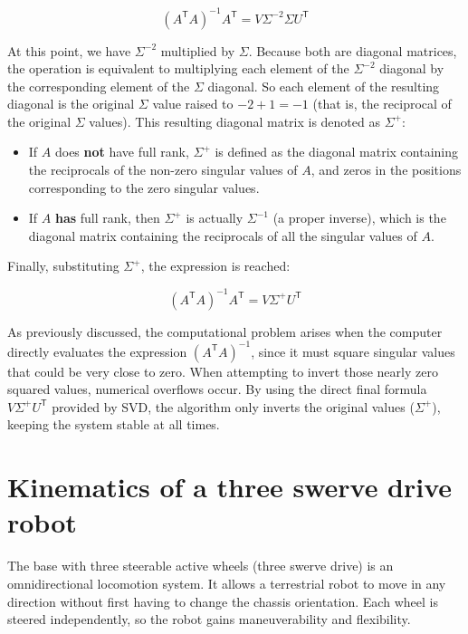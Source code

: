 \documentclass[11pt,a4paper]{article}
\newcommand{\trans}{\mathsf{T}}      %
\begin{document}
\begin{equation}
    (A^{\trans} A)^{-1} A^{\trans} = V \Sigma^{-2} \Sigma U^{\trans}
\end{equation}

At this point, we have \(\Sigma^{-2}\) multiplied by \(\Sigma\). Because both are diagonal matrices, the operation is equivalent to multiplying each element of the \(\Sigma^{-2}\) diagonal by the corresponding element of the \(\Sigma\) diagonal. So each element of the resulting diagonal is the original \(\Sigma\) value raised to \(-2 + 1 = -1\) (that is, the reciprocal of the original \(\Sigma\) values). This resulting diagonal matrix is denoted as \(\Sigma^+\):

\begin{itemize}
    \item If \(A\) does \textbf{not} have full rank, \(\Sigma^+\) is defined as the diagonal matrix containing the reciprocals of the non-zero singular values of \(A\), and zeros in the positions corresponding to the zero singular values.
    \item If \(A\) \textbf{has} full rank, then \(\Sigma^+\) is actually \(\Sigma^{-1}\) (a proper inverse), which is the diagonal matrix containing the reciprocals of all the singular values of \(A\).
\end{itemize}

Finally, substituting \(\Sigma^+\), the expression is reached:

\begin{equation}
    (A^{\trans} A)^{-1} A^{\trans} = V \Sigma^+ U^{\trans}
\end{equation}

As previously discussed, the computational problem arises when the computer directly evaluates the expression \((A^{\trans} A)^{-1}\), since it must square singular values that could be very close to zero. When attempting to invert those nearly zero squared values, numerical overflows occur. By using the direct final formula \(V \Sigma^+ U^{\trans}\) provided by SVD, the algorithm only inverts the original values (\(\Sigma^+\)), keeping the system stable at all times.

\section{Kinematics of a three swerve drive robot}

The base with three steerable active wheels (three swerve drive) is an omnidirectional locomotion system. It allows a terrestrial robot to move in any direction without first having to change the chassis orientation. Each wheel is steered independently, so the robot gains maneuverability and flexibility.
\end{document}
